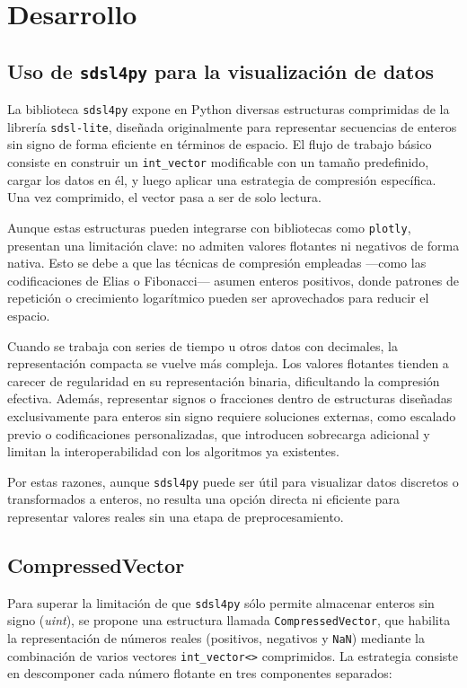 \section{Desarrollo}


\subsection{Uso de \texttt{sdsl4py} para la visualización de datos}

La biblioteca \texttt{sdsl4py} expone en Python diversas estructuras comprimidas de la librería \texttt{sdsl-lite}, diseñada originalmente para representar secuencias de enteros sin signo de forma eficiente en términos de espacio. El flujo de trabajo básico consiste en construir un \texttt{int\_vector} modificable con un tamaño predefinido, cargar los datos en él, y luego aplicar una estrategia de compresión específica. Una vez comprimido, el vector pasa a ser de solo lectura.

Aunque estas estructuras pueden integrarse con bibliotecas como \texttt{plotly}, presentan una limitación clave: no admiten valores flotantes ni negativos de forma nativa. Esto se debe a que las técnicas de compresión empleadas —como las codificaciones de Elias o Fibonacci— asumen enteros positivos, donde patrones de repetición o crecimiento logarítmico pueden ser aprovechados para reducir el espacio.

Cuando se trabaja con series de tiempo u otros datos con decimales, la representación compacta se vuelve más compleja. Los valores flotantes tienden a carecer de regularidad en su representación binaria, dificultando la compresión efectiva. Además, representar signos o fracciones dentro de estructuras diseñadas exclusivamente para enteros sin signo requiere soluciones externas, como escalado previo o codificaciones personalizadas, que introducen sobrecarga adicional y limitan la interoperabilidad con los algoritmos ya existentes.

Por estas razones, aunque \texttt{sdsl4py} puede ser útil para visualizar datos discretos o transformados a enteros, no resulta una opción directa ni eficiente para representar valores reales sin una etapa de preprocesamiento.


\subsection{CompressedVector}

Para superar la limitación de que \texttt{sdsl4py} sólo permite almacenar enteros sin signo (\textit{uint}), se propone una estructura llamada \texttt{CompressedVector}, que habilita la representación de números reales (positivos, negativos y \texttt{NaN}) mediante la combinación de varios vectores \texttt{int\_vector<>} comprimidos. La estrategia consiste en descomponer cada número flotante en tres componentes separados:

